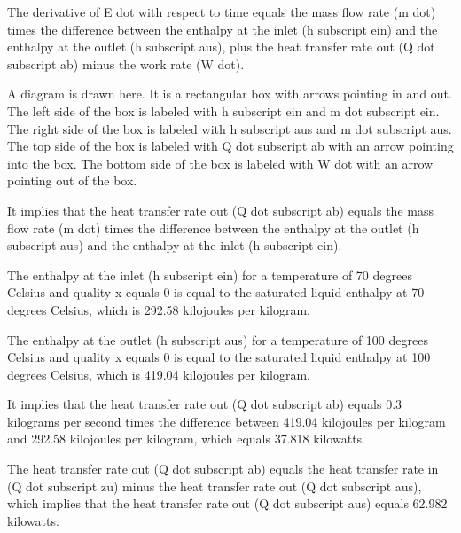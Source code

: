 The derivative of E dot with respect to time equals the mass flow rate (m dot) times the difference between the enthalpy at the inlet (h subscript ein) and the enthalpy at the outlet (h subscript aus), plus the heat transfer rate out (Q dot subscript ab) minus the work rate (W dot).

A diagram is drawn here. It is a rectangular box with arrows pointing in and out. The left side of the box is labeled with h subscript ein and m dot subscript ein. The right side of the box is labeled with h subscript aus and m dot subscript aus. The top side of the box is labeled with Q dot subscript ab with an arrow pointing into the box. The bottom side of the box is labeled with W dot with an arrow pointing out of the box.

It implies that the heat transfer rate out (Q dot subscript ab) equals the mass flow rate (m dot) times the difference between the enthalpy at the outlet (h subscript aus) and the enthalpy at the inlet (h subscript ein).

The enthalpy at the inlet (h subscript ein) for a temperature of 70 degrees Celsius and quality x equals 0 is equal to the saturated liquid enthalpy at 70 degrees Celsius, which is 292.58 kilojoules per kilogram.

The enthalpy at the outlet (h subscript aus) for a temperature of 100 degrees Celsius and quality x equals 0 is equal to the saturated liquid enthalpy at 100 degrees Celsius, which is 419.04 kilojoules per kilogram.

It implies that the heat transfer rate out (Q dot subscript ab) equals 0.3 kilograms per second times the difference between 419.04 kilojoules per kilogram and 292.58 kilojoules per kilogram, which equals 37.818 kilowatts.

The heat transfer rate out (Q dot subscript ab) equals the heat transfer rate in (Q dot subscript zu) minus the heat transfer rate out (Q dot subscript aus), which implies that the heat transfer rate out (Q dot subscript aus) equals 62.982 kilowatts.